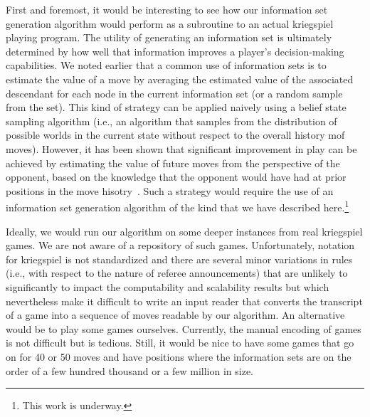 \documentclass[11pt]{article}
\begin{document}
First and foremost, it would be interesting to see how our information set generation algorithm would perform as a
subroutine to an actual kriegspiel playing program.  The utility of generating an information set is ultimately
determined by how well that information improves a player's decision-making capabilities.  We noted earlier that a
common use of information sets is to estimate the value of a move by averaging the estimated value of the associated
descendant for each node in the current information set (or a random sample from the set).  This kind of strategy can be
applied naively using a belief state sampling algorithm (i.e., an algorithm that samples from the distribution of
possible worlds in the current state without respect to the overall history mof moves).  However, it has been shown that
significant improvement in play can be achieved by estimating the value of future moves from the perspective of the
opponent, based on the knowledge that the opponent would have had at prior positions in the move
hisotry~\cite{richards07opponent}.  Such a strategy would require the use of an information set generation algorithm of the
kind that we have described here.\footnote{This work is underway.}

Ideally, we would run our algorithm on some deeper instances from real kriegspiel games.  We are not aware of a
repository of such games.  Unfortunately, notation for kriegspiel is not standardized and there are several minor
variations in rules (i.e., with respect to the nature of referee announcements) that are unlikely to significantly to
impact the computability and scalability results but which nevertheless make it difficult to write an input reader that
converts the transcript of a game into a sequence of moves readable by our algorithm.  An alternative would be to play
some games ourselves.  Currently, the manual encoding of games is not difficult but is tedious.  Still, it would be nice
to have some games that go on for 40 or 50 moves and have positions where the information sets are on the order of a few
hundred thousand or a few million in size.
\end{document}
